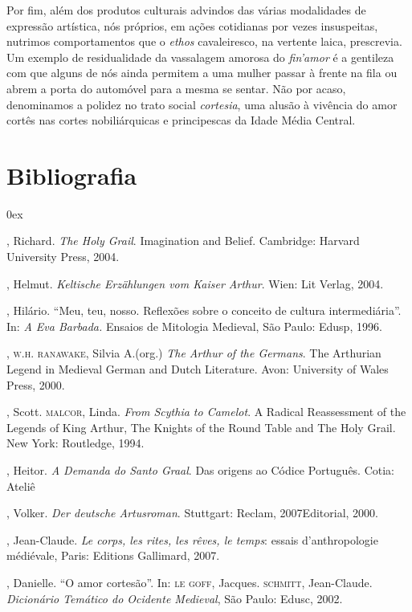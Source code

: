 Por fim, além dos produtos culturais advindos das várias modalidades de
expressão artística, nós próprios, em ações cotidianas por vezes
insuspeitas, nutrimos comportamentos que o \textit{ethos} cavaleiresco,
na vertente laica, prescrevia. Um exemplo de residualidade da
vassalagem amorosa do \textit{fin’amor} é a gentileza com que alguns de
nós ainda permitem a uma mulher passar à frente na fila ou abrem a
porta do automóvel para a mesma se sentar. Não por acaso, denominamos a
polidez no trato social \textit{cortesia}, uma alusão à vivência do
amor cortês nas cortes nobiliárquicas e principescas da Idade Média
Central. 


\section{Bibliografia}

\begin{description}0ex\parskip3pt
\newcommand{\tit}[1]{\item[\textnormal{\textsc{\MakeTextLowercase{#1}}}]}
\newcommand{\titidem}{\item[\line(1,0){25}]}

\tit{BARBER}, Richard.\textit{ The Holy Grail}. Imagination and Belief.
Cambridge: Harvard University Press, 2004.

\tit{BIRKHAN}, Helmut. \textit{Keltische Erzählungen vom Kaiser Arthur}. Wien:
Lit Verlag, 2004.

\tit{FRANCO JR.}, Hilário. “Meu, teu, nosso. Reflexões sobre o conceito de
cultura intermediária”. In: \textit{A Eva Barbada.} Ensaios de
Mitologia Medieval, São Paulo: Edusp, 1996.

\tit{JACKSON}, \textsc{w.h. ranawake}, Silvia A.(org.) \textit{The Arthur of the
Germans}. The Arthurian Legend in Medieval German and Dutch Literature.
Avon: University of Wales Press, 2000. 

\tit{LITTLETON}, Scott. \textsc{malcor}, Linda. \textit{From Scythia to Camelot}. A
Radical Reassessment of the Legends of King Arthur, The Knights of the
Round Table and The Holy Grail. New York: Routledge, 1994.

\tit{MEGALE}, Heitor.\textit{ A Demanda do Santo Graal}. Das origens ao Códice
Português. Cotia: Ateliê 

\tit{MERTENS}, Volker. \textit{Der deutsche Artusroman}. Stuttgart: Reclam,
2007Editorial, 2000.

\tit{SCHMITT}, Jean-Claude. \textit{Le corps, les rites, les rêves, le temps}:
essais d’anthropologie médiévale, Paris: Editions Gallimard, 2007.

\tit{RÉGNIER-BOHLER}, Danielle. “O amor cortesão”. In: \textsc{le goff}, Jacques.
\textsc{schmitt}, Jean-Claude. \textit{Dicionário Temático do Ocidente
Medieval}, São Paulo: Edusc, 2002.
\end{description}

\vfill\pagebreak
\endgroup
